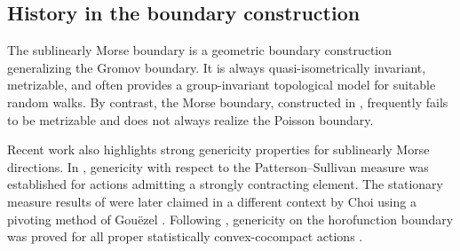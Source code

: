 \documentclass[12 pt]{amsart}
\theoremstyle{definition}
\theoremstyle{remark}
\begin{document}
\subsection*{History in the boundary construction}
The sublinearly Morse boundary is a geometric boundary construction generalizing the Gromov boundary. It is always quasi-isometrically invariant, metrizable, and often provides a group-invariant topological model for suitable random walks. By contrast, the Morse boundary, constructed in \cite{Cordes,CS}, frequently fails to be metrizable and does not always realize the Poisson boundary.

Recent work also highlights strong genericity properties for sublinearly Morse directions. In \cite{GQR22}, genericity with respect to the Patterson–Sullivan measure was established for actions admitting a strongly contracting element. The stationary measure results of \cite{GQR22} were later claimed in a different context by Choi \cite{Choi} using a pivoting method of Gou\"ezel \cite{Gou22}. Following \cite{wenyuan}, genericity on the horofunction boundary was proved for all proper statistically convex-cocompact actions \cite{QY24}. 
\end{document}

